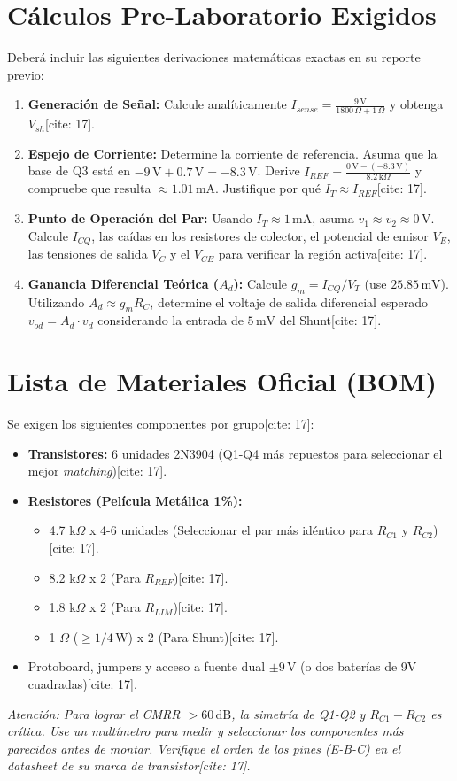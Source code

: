 \documentclass[11pt, a4paper]{article}
\begin{document}
\section{Cálculos Pre-Laboratorio Exigidos}
Deberá incluir las siguientes derivaciones matemáticas exactas en su reporte previo:
\begin{enumerate}
    \item \textbf{Generación de Señal:} Calcule analíticamente $I_{sense} = \frac{9\,\text{V}}{1800\,\Omega + 1\,\Omega}$ y obtenga $V_{sh}$[cite: 17].
    \item \textbf{Espejo de Corriente:} Determine la corriente de referencia. Asuma que la base de Q3 está en $-9\,\text{V} + 0.7\,\text{V} = -8.3\,\text{V}$. Derive $I_{REF} = \frac{0\,\text{V} - (-8.3\,\text{V})}{8.2\,\text{k}\Omega}$ y compruebe que resulta $\approx 1.01\,\text{mA}$. Justifique por qué $I_T \approx I_{REF}$[cite: 17].
    \item \textbf{Punto de Operación del Par:} Usando $I_T \approx 1\,\text{mA}$, asuma $v_1 \approx v_2 \approx 0\,\text{V}$. Calcule $I_{CQ}$, las caídas en los resistores de colector, el potencial de emisor $V_E$, las tensiones de salida $V_C$ y el $V_{CE}$ para verificar la región activa[cite: 17].
    \item \textbf{Ganancia Diferencial Teórica ($A_d$):} Calcule $g_m = I_{CQ}/V_T$ (use $25.85\,\text{mV}$). Utilizando $A_d \approx g_m R_C$, determine el voltaje de salida diferencial esperado $v_{od} = A_d \cdot v_d$ considerando la entrada de $5\,\text{mV}$ del Shunt[cite: 17].
\end{enumerate}

\section{Lista de Materiales Oficial (BOM)}
Se exigen los siguientes componentes por grupo[cite: 17]:
\begin{itemize}
    \item \textbf{Transistores:} 6 unidades 2N3904 (Q1-Q4 más repuestos para seleccionar el mejor \textit{matching})[cite: 17].
    \item \textbf{Resistores (Película Metálica 1\%):}
    \begin{itemize}
        \item 4.7 k$\Omega$ x 4-6 unidades (Seleccionar el par más idéntico para $R_{C1}$ y $R_{C2}$)[cite: 17].
        \item 8.2 k$\Omega$ x 2 (Para $R_{REF}$)[cite: 17].
        \item 1.8 k$\Omega$ x 2 (Para $R_{LIM}$)[cite: 17].
        \item 1 $\Omega$ ($\ge 1/4\,\text{W}$) x 2 (Para Shunt)[cite: 17].
    \end{itemize}
    \item Protoboard, jumpers y acceso a fuente dual $\pm 9\,\text{V}$ (o dos baterías de 9V cuadradas)[cite: 17].
\end{itemize}
\textit{Atención: Para lograr el CMRR $> 60\,\text{dB}$, la simetría de Q1-Q2 y $R_{C1}-R_{C2}$ es crítica. Use un multímetro para medir y seleccionar los componentes más parecidos antes de montar. Verifique el orden de los pines (E-B-C) en el datasheet de su marca de transistor[cite: 17].}
\end{document}
